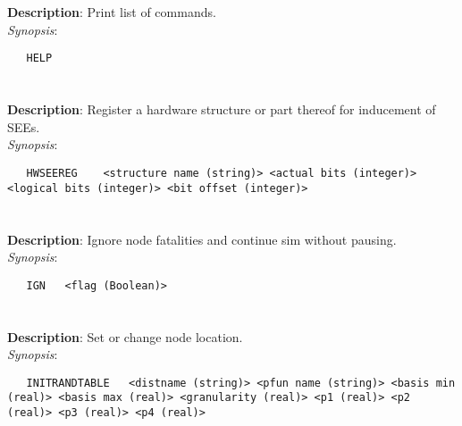 \section{\quad{}}
\label{manpages:HELP}
\label{manpages:help}
\vspace{-0.1in}
{\bf Description}: 	Print list of commands.\\[1.5ex]
{\em Synopsis}:
\vspace{-0.05in}
\scriptsize
\begin{lstlisting}
   HELP   											
\end{lstlisting}
\normalsize
\vspace{-0.05in}


\section{\quad{}}
\label{manpages:HWSEEREG}
\label{manpages:hwseereg}
\vspace{-0.1in}
{\bf Description}: 	Register a hardware structure or part thereof for inducement of SEEs.\\[1.5ex]
{\em Synopsis}:
\vspace{-0.05in}
\scriptsize
\begin{lstlisting}
   HWSEEREG    <structure name (string)> <actual bits (integer)> <logical bits (integer)> <bit offset (integer)>				
\end{lstlisting}
\normalsize
\vspace{-0.05in}


\section{\quad{}}
\label{manpages:IGN}
\label{manpages:ign}
\vspace{-0.1in}
{\bf Description}: 	Ignore node fatalities and continue sim without pausing.\\[1.5ex]
{\em Synopsis}:
\vspace{-0.05in}
\scriptsize
\begin{lstlisting}
   IGN   <flag (Boolean)>																
\end{lstlisting}
\normalsize
\vspace{-0.05in}


\section{\quad{}}
\label{manpages:INITRANDTABLE}
\label{manpages:initrandtable}
\vspace{-0.1in}
{\bf Description}: 	Set or change node location.\\[1.5ex]
{\em Synopsis}:
\vspace{-0.05in}
\scriptsize
\begin{lstlisting}
   INITRANDTABLE   <distname (string)> <pfun name (string)> <basis min (real)> <basis max (real)> <granularity (real)> <p1 (real)> <p2 (real)> <p3 (real)> <p4 (real)>			
\end{lstlisting}
\normalsize
\vspace{-0.05in}


